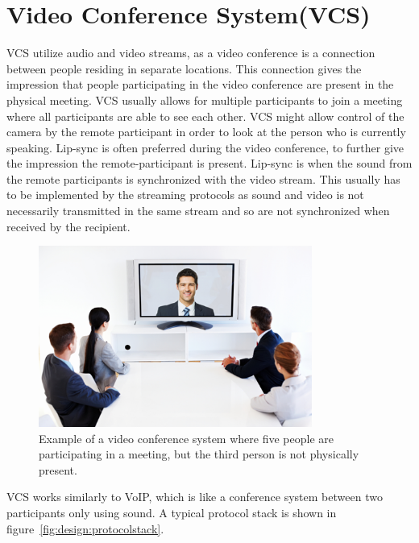 




\section{Video Conference System(VCS)} \label{sec:design:vcs}
\ac{VCS} utilize audio and video streams, as a video conference is a connection between people residing in separate locations. This connection gives the impression that people participating in the video conference are present in the physical meeting. VCS usually allows for multiple participants to join a meeting where all participants are able to see each other. VCS might allow control of the camera by the remote participant in order to look at the person who is currently speaking. 
Lip-sync is often preferred during the video conference, to further give the impression the remote-participant is present. Lip-sync is when the sound from the remote participants is synchronized with the video stream. This usually has to be implemented by the streaming protocols as sound and video is not necessarily transmitted in the same stream and so are not synchronized when received by the recipient.

\begin{figure}[H]
	\centering
	\includegraphics[width=0.8\textwidth]{figures/vcs_overview.png}
	\caption{Example of a video conference system where five people are participating in a meeting, but the third person is not physically present.} \label{fig:design:vcs}
\end{figure}

\ac{VCS} works similarly to \ac{VoIP}, which is like a conference system between two participants only using sound. A typical protocol stack is shown in figure~\ref{fig:design:protocolstack}. 

